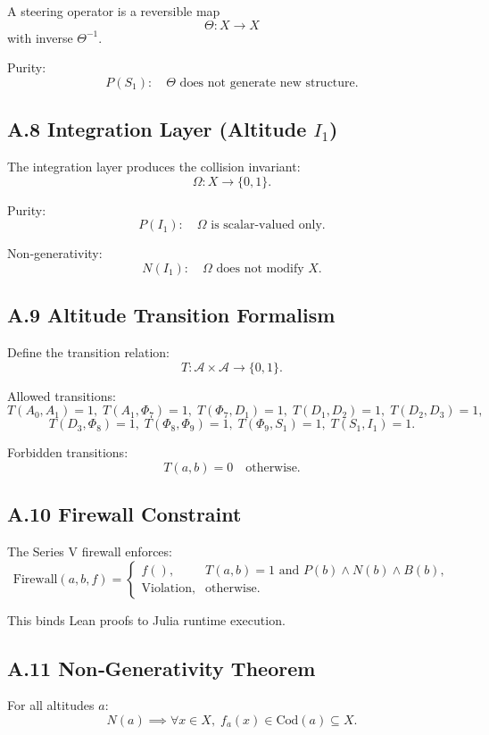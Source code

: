 A steering operator is a reversible map
\[
\Theta : X \to X
\]
with inverse $\Theta^{-1}$.

Purity:
\[
P(S_1):\quad \Theta \text{ does not generate new structure.}
\]

\subsection*{A.8 Integration Layer (Altitude $I_1$)}

The integration layer produces the collision invariant:
\[
\Omega : X \to \{0,1\}.
\]

Purity:
\[
P(I_1):\quad \Omega \text{ is scalar‑valued only.}
\]

Non‑generativity:
\[
N(I_1):\quad \Omega \text{ does not modify } X.
\]

\subsection*{A.9 Altitude Transition Formalism}

Define the transition relation:
\[
T : \mathcal{A} \times \mathcal{A} \to \{0,1\}.
\]

Allowed transitions:
\[
T(A_0,A_1)=1,\;
T(A_1,\Phi_7)=1,\;
T(\Phi_7,D_1)=1,\;
T(D_1,D_2)=1,\;
T(D_2,D_3)=1,
\]
\[
T(D_3,\Phi_8)=1,\;
T(\Phi_8,\Phi_9)=1,\;
T(\Phi_9,S_1)=1,\;
T(S_1,I_1)=1.
\]

Forbidden transitions:
\[
T(a,b)=0 \quad \text{otherwise}.
\]

\subsection*{A.10 Firewall Constraint}

The Series V firewall enforces:
\[
\text{Firewall}(a,b,f) =
\begin{cases}
f(), & T(a,b)=1 \text{ and } P(b) \land N(b) \land B(b), \\
\text{Violation}, & \text{otherwise}.
\end{cases}
\]

This binds Lean proofs to Julia runtime execution.

\subsection*{A.11 Non‑Generativity Theorem}

For all altitudes $a$:
\[
N(a) \implies \forall x \in X,\; f_a(x) \in \mathrm{Cod}(a) \subseteq X.
\]

